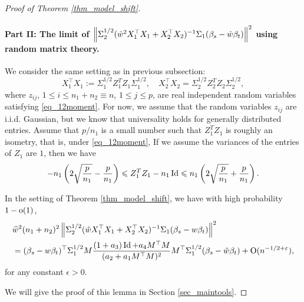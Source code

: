 \begin{proof}[Proof of Theorem \ref{thm_model_shift}]
\paragraph{Part II: The limit of $\left\| \Sigma_2^{1/2} (\hat{w}^2X_1^{\top}X_1 + X_2^{\top}X_2)^{-1}\Sigma_1 (\beta_s - \hat{w}\beta_t) \right\|^2$ using random matrix theory.}
We consider the same setting as in previous subsection:
$$ X_1^{\top}X_1:=\Sigma_1^{1/2}  Z_1^T Z_1 \Sigma_1^{1/2} ,\quad X_2^{\top}X_2= \Sigma_2^{1/2}  Z_2^T Z_2 \Sigma_2^{1/2},$$
where $z_{ij}$, $1 \leq i \leq n_1+n_2\equiv n$, $1 \leq j \leq p$, are real independent random variables satisfying \eqref{eq_12moment}. For now, we assume that the random variables $z_{ij}$ are i.i.d. Gaussian, but we know that universality holds for generally distributed entries. Assume that $p/n_1$ is a small number such that $Z_1^TZ_1$ is roughly an isometry, that is, under \eqref{eq_12moment},
{\color{blue}
If we assume the variances of the entries of $Z_1$ are $1$, then we have
\begin{align}
- {n_1} \left(2\sqrt{\frac{p}{n_1}} - {\frac{p}{n_1}}\right)  \leqslant {Z_1^T Z_1 -  n_1 \operatorname{Id}}  \leqslant {n_1} \left(2\sqrt{\frac{p}{n_1}} + {\frac{p}{n_1}}\right) . \label{eq_isometric}
\end{align}
}

\begin{lemma}\label{lem_cov_derivative}
	In the setting of Theorem \ref{thm_model_shift}, we have with high probability $1-{\rm o}(1)$,
\begin{equation}\label{lem_cov_derv_eq}
\begin{split}
&\widehat w^{2}(n_1+n_2)^2\left\| \Sigma_2^{1/2} (\hat{w}X_1^{\top}X_1 + X_2^{\top}X_2)^{-1}\Sigma_1 (\beta_s - {w}\beta_t) \right\|^2 \\
&= (\beta_s - {w}\beta_t)^{\top} \Sigma_1^{1/2} {M} \frac{(1 + a_3)\operatorname{Id} + a_4 {M}^{\top}{M}}{(a_2 + a_1 {M}^{\top}{M})^2} {M}^{\top} \Sigma_1^{1/2} (\beta_s - \hat{w}\beta_t) +\operatorname{O}(n^{-1/2+{\varepsilon}}),
\end{split}
\end{equation}
	for any constant $\epsilon>0$. %
\end{lemma}
We will give the proof of this lemma in Section \ref{sec_maintools}.
\end{proof}


